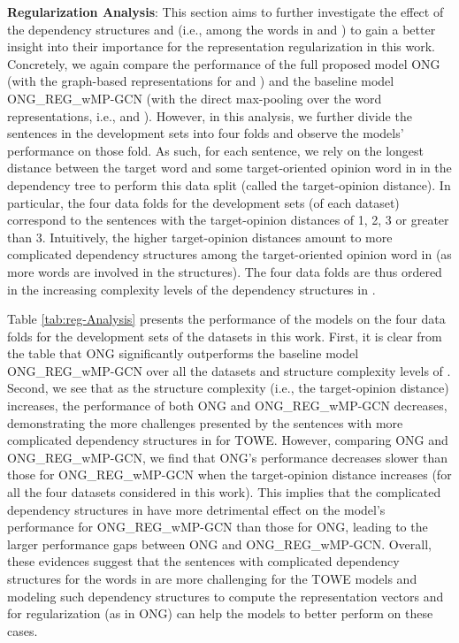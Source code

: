\documentclass[11pt,a4paper]{article}
\begin{document}
\textbf{Regularization Analysis}: This section aims to further investigate the effect of the dependency structures  and  (i.e., among the words in  and ) to gain a better insight into their importance for the representation regularization in this work. Concretely, we again compare the performance of the full proposed model ONG (with the graph-based representations for  and ) and the baseline model ONG\_REG\_wMP-GCN (with the direct max-pooling over the word representations, i.e.,  and ). However, in this analysis, we further divide the sentences in the development sets into four folds and observe the models' performance on those fold. As such, for each sentence, we rely on the longest distance between the target word and some target-oriented opinion word in  in the dependency tree to perform this data split (called the target-opinion distance). In particular, the four data folds for the development sets (of each dataset) correspond to the sentences with the target-opinion distances of 1, 2, 3 or greater than 3. Intuitively, the higher target-opinion distances amount to more complicated dependency structures among the target-oriented opinion word in  (as more words are involved in the structures). The four data folds are thus ordered in the increasing complexity levels of the dependency structures in .

Table \ref{tab:reg-Analysis} presents the performance of the models on the four data folds for the development sets of the datasets in this work. First, it is clear from the table that ONG significantly outperforms the baseline model ONG\_REG\_wMP-GCN over all the datasets and structure complexity levels of . Second, we see that as the structure complexity (i.e., the target-opinion distance) increases, the performance of both ONG and ONG\_REG\_wMP-GCN decreases, demonstrating the more challenges presented by the sentences with more complicated dependency structures in  for TOWE. However, comparing ONG and ONG\_REG\_wMP-GCN, we find that ONG's performance decreases slower than those for ONG\_REG\_wMP-GCN when the target-opinion distance increases (for all the four datasets considered in this work). This implies that the complicated dependency structures in  have more detrimental effect on the model's performance for ONG\_REG\_wMP-GCN than those for ONG, leading to the larger performance gaps between ONG and ONG\_REG\_wMP-GCN. Overall, these evidences suggest that the sentences with complicated dependency structures for the words in  are more challenging for the TOWE models and modeling such dependency structures to compute the representation vectors  and  for regularization (as in ONG) can help the models to better perform on these cases.
\end{document}
